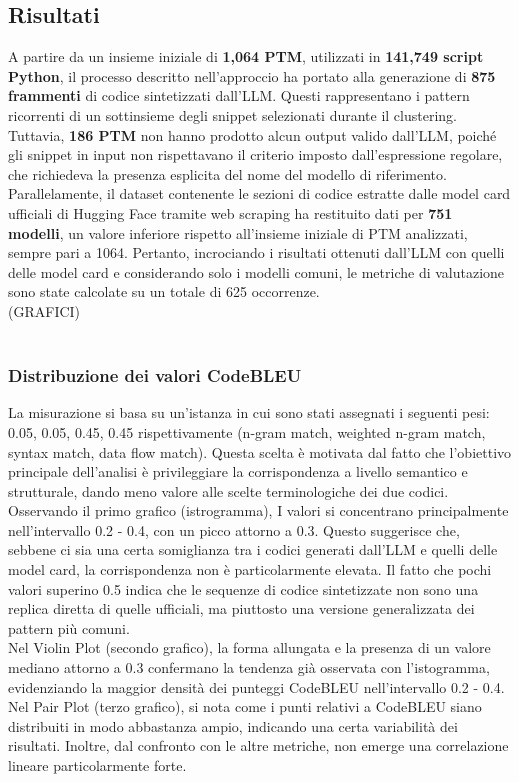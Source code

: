 \documentclass{article}
\begin{document}
\subsection{Risultati}
A partire da un insieme iniziale di \textbf{1,064 PTM}, utilizzati in \textbf{141,749 script Python}, il processo descritto nell’approccio ha portato alla generazione di \textbf{875 frammenti} di codice sintetizzati dall’LLM. Questi rappresentano i pattern ricorrenti di un sottinsieme degli snippet selezionati durante il clustering. Tuttavia, \textbf{186 PTM} non hanno prodotto alcun output valido dall’LLM, poiché gli snippet in input non rispettavano il criterio imposto dall’espressione regolare, che richiedeva la presenza esplicita del nome del modello di riferimento.\\
Parallelamente, il dataset contenente le sezioni di codice estratte dalle model card ufficiali di Hugging Face tramite web scraping ha restituito dati per \textbf{751 modelli}, un valore inferiore rispetto all'insieme iniziale di PTM analizzati, sempre pari a 1064. Pertanto, incrociando i risultati ottenuti dall’LLM con quelli delle model card e considerando solo i modelli comuni, le metriche di valutazione sono state calcolate su un totale di 625 occorrenze.\\
(GRAFICI)\\
\\

\subsubsection{Distribuzione dei valori CodeBLEU}
La misurazione si basa su un'istanza in cui sono stati assegnati i seguenti pesi: 0.05, 0.05, 0.45, 0.45 rispettivamente (n-gram match, weighted n-gram match, syntax match, data flow match). Questa scelta è motivata dal fatto che l’obiettivo principale dell’analisi è privileggiare la corrispondenza a livello semantico e strutturale, dando meno valore alle scelte terminologiche dei due codici.\\
Osservando il primo grafico (istrogramma), I valori si concentrano principalmente nell’intervallo 0.2 - 0.4, con un picco attorno a 0.3. Questo suggerisce che, sebbene ci sia una certa somiglianza tra i codici generati dall’LLM e quelli delle model card, la corrispondenza non è particolarmente elevata. Il fatto che pochi valori superino 0.5 indica che le sequenze di codice sintetizzate non sono una replica diretta di quelle ufficiali, ma piuttosto una versione generalizzata dei pattern più comuni.\\
Nel Violin Plot (secondo grafico), la forma allungata e la presenza di un valore mediano attorno a 0.3 confermano la tendenza già osservata con l’istogramma, evidenziando la maggior densità dei punteggi CodeBLEU nell’intervallo 0.2 - 0.4. Nel Pair Plot (terzo grafico), si nota come i punti relativi a CodeBLEU siano distribuiti in modo abbastanza ampio, indicando una certa variabilità dei risultati. Inoltre, dal confronto con le altre metriche, non emerge una correlazione lineare particolarmente forte.
\end{document}

